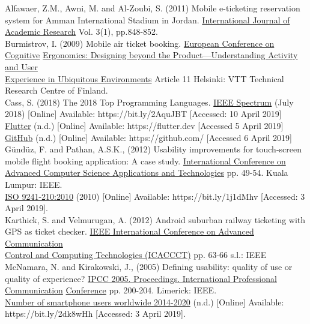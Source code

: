 \documentclass[version=last,fontsize=13pt]{scrartcl}
\begin{document}
Alfawaer, Z.M., Awni, M. and Al-Zoubi, S. (2011) Mobile e-ticketing reservation system for Amman International Stadium in Jordan. \underline{International Journal of Academic Research}  Vol. 3(1), pp.848-852.\\

Burmistrov, I. (2009) Mobile air ticket booking.  \underline{European Conference on Cognitive} \underline{Ergonomics: Designing beyond the Product}\underline{---Understanding Activity and User}\\ \underline{Experience in Ubiquitous Environments} Article 11 Helsinki: VTT Technical Research Centre of Finland.\\

Cass, S. (2018) The 2018 Top Programming Languages.  \underline{IEEE Spectrum} (July 2018) [Online] Available: https://bit.ly/2AquJBT [Accessed: 10 April 2019]\\

\underline{Flutter} (n.d.) [Online] Available: https://flutter.dev [Accessed 5 April 2019]\\

\underline{GitHub} (n.d.) [Online] Available: https://github.com/ [Accessed 6 April 2019]\\

Gündüz, F. and Pathan, A.S.K., (2012) Usability improvements for touch-screen mobile flight booking application: A case study.  \underline{International Conference on Advanced } \underline{Computer Science Applications and Technologies}  pp. 49-54. Kuala Lumpur: IEEE.\\

\underline{ISO 9241-210:2010} (2010) [Online] Available: https://bit.ly/1j1dMhv [Accessed: 3 April 2019].\\

Karthick, S. and Velmurugan, A. (2012) Android suburban railway ticketing with GPS as ticket checker.  \underline{IEEE International Conference on Advanced Communication }\\ \underline{Control and Computing Technologies (ICACCCT)} pp. 63-66  s.l.: IEEE\\

McNamara, N. and Kirakowski, J., (2005)  Defining usability: quality of use or quality of experience?  \underline{IPCC 2005. Proceedings. International Professional Communication} \underline{Conference} pp. 200-204. Limerick: IEEE.\\

\underline{Number of smartphone users worldwide 2014-2020} (n.d.) [Online]  Available:\\ https://bit.ly/2dk8wHh [Accessed: 3 April 2019].\\
\end{document}
